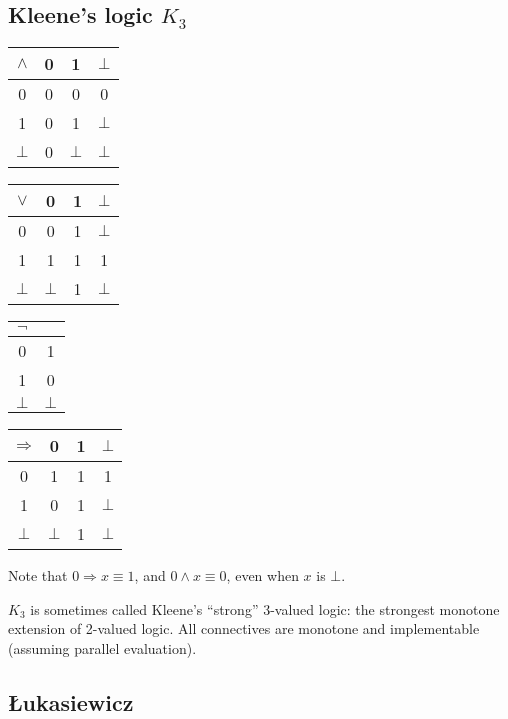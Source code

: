 \documentclass{llncs}
\newcommand{\impl}{\mathbin{\Rightarrow}}
\begin{document}
\subsection{Kleene's logic $K_3$}

\begin{center}
\begin{tabular}{|c|ccc|}
\hline
   $\land$& 0 & 1 & $\bot$
\\ \hline
   0      & 0 & 0 & 0
\\ 1      & 0 & 1 & $\bot$
\\ $\bot$ & 0 & $\bot$ & $\bot$
\\ \hline
\end{tabular}
\hfil
\begin{tabular}{|c|ccc|}
\hline
   $\lor$ & 0 & 1 & $\bot$
\\ \hline
   0      & 0 & 1 & $\bot$
\\ 1      & 1 & 1 & 1
\\ $\bot$ & $\bot$ & 1 & $\bot$
\\ \hline
\end{tabular}
\hfil
\begin{tabular}{|c|c|}
\hline
   $\neg$ & 
\\ \hline
   0      & 1 
\\ 1      & 0 
\\ $\bot$ & $\bot$
\\ \hline
\end{tabular}
\hfil
\begin{tabular}{|c|ccc|}
\hline
   $\impl$ & 0 & 1 & $\bot$
\\ \hline
   0      & 1 & 1 & 1
\\ 1      & 0 & 1 & $\bot$
\\ $\bot$ & $\bot$ & 1 & $\bot$
\\ \hline
\end{tabular}
\end{center}
%
Note that $0 \impl x \equiv 1$, and $0 \land x \equiv 0$,
even when $x$ is $\bot$.

$K_3$ is sometimes called Kleene's ``strong'' 3-valued logic:
the strongest monotone extension of 2-valued logic.
All connectives are monotone and implementable
(assuming parallel evaluation).


\subsection{{\L}ukasiewicz}
\end{document}
